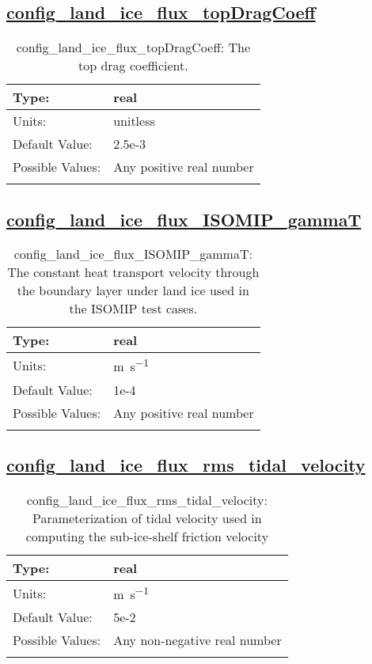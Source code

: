 \subsection[config\_land\_ice\_flux\_topDragCoeff]{\hyperref[sec:nm_tab_land_ice_fluxes]{config\_land\_ice\_flux\_topDragCoeff}}
\label{subsec:nm_sec_config_land_ice_flux_topDragCoeff}
\begin{center}
\begin{longtable}{| p{2.0in} || p{4.0in} |}
    \hline
    Type: & real \\
    \hline
    Units: & \si{unitless} \\
    \hline
    Default Value: & 2.5e-3 \\
    \hline
    Possible Values: & Any positive real number \\
    \hline
    \caption{config\_land\_ice\_flux\_topDragCoeff: The top drag coefficient.}
\end{longtable}
\end{center}
\subsection[config\_land\_ice\_flux\_ISOMIP\_gammaT]{\hyperref[sec:nm_tab_land_ice_fluxes]{config\_land\_ice\_flux\_ISOMIP\_gammaT}}
\label{subsec:nm_sec_config_land_ice_flux_ISOMIP_gammaT}
\begin{center}
\begin{longtable}{| p{2.0in} || p{4.0in} |}
    \hline
    Type: & real \\
    \hline
    Units: & \si{m.s^{-1}} \\
    \hline
    Default Value: & 1e-4 \\
    \hline
    Possible Values: & Any positive real number \\
    \hline
    \caption{config\_land\_ice\_flux\_ISOMIP\_gammaT: The constant heat transport velocity through the boundary layer under land ice used in the ISOMIP test cases.}
\end{longtable}
\end{center}
\subsection[config\_land\_ice\_flux\_rms\_tidal\_velocity]{\hyperref[sec:nm_tab_land_ice_fluxes]{config\_land\_ice\_flux\_rms\_tidal\_velocity}}
\label{subsec:nm_sec_config_land_ice_flux_rms_tidal_velocity}
\begin{center}
\begin{longtable}{| p{2.0in} || p{4.0in} |}
    \hline
    Type: & real \\
    \hline
    Units: & \si{m.s^{-1}} \\
    \hline
    Default Value: & 5e-2 \\
    \hline
    Possible Values: & Any non-negative real number \\
    \hline
    \caption{config\_land\_ice\_flux\_rms\_tidal\_velocity: Parameterization of tidal velocity used in computing the sub-ice-shelf friction velocity}
\end{longtable}
\end{center}
